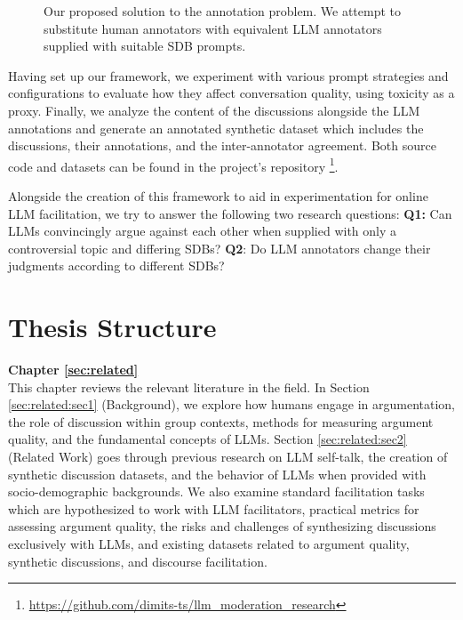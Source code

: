 \begin{figure}
	\centering
	
	\caption{Our proposed solution to the annotation problem. We attempt to substitute human annotators with equivalent LLM annotators supplied with suitable \ac{SDB} prompts.}
	\label{fig::goals_4}
\end{figure}


Having set up our framework, we experiment with various prompt strategies and configurations to evaluate how they affect conversation quality, using toxicity as a proxy. Finally, we analyze the content of the discussions alongside the LLM annotations and generate an annotated synthetic dataset which includes the discussions, their annotations, and the inter-annotator agreement. Both source code and datasets can be found in the project's repository \footnote{\url{https://github.com/dimits-ts/llm_moderation_research}}.

Alongside the creation of this framework to aid in experimentation for online LLM facilitation, we try to answer the following two research questions: \textbf{Q1:} Can LLMs convincingly argue against each other when supplied with only a controversial topic and differing \acp{SDB}? \textbf{Q2}: Do LLM annotators change their judgments according to different \acp{SDB}?

\section{Thesis Structure}
\label{sec:intro:structure}

\textbf{Chapter \ref{sec:related}} \\[0.2em]

This chapter reviews the relevant literature in the field. In Section \ref{sec:related:sec1} (Background), we explore how humans engage in argumentation, the role of discussion within group contexts, methods for measuring argument quality, and the fundamental concepts of \acp{LLM}. Section \ref{sec:related:sec2} (Related Work) goes through previous research on LLM self-talk, the creation of synthetic discussion datasets, and the behavior of LLMs when provided with socio-demographic backgrounds. We also examine standard facilitation tasks which are hypothesized to work with LLM facilitators, practical metrics for assessing argument quality, the risks and challenges of synthesizing discussions exclusively with LLMs, and existing datasets related to argument quality, synthetic discussions, and discourse facilitation.


